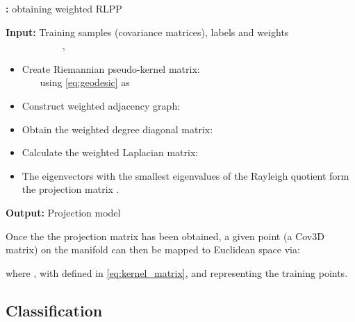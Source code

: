 \documentclass[10pt,twocolumn,letterpaper]{article}
\newcommand{\eqsize}{\footnotesize}
\newcommand{\cov}{{Cov3D}}
\begin{document}
\begin{algorithm}
  \footnotesize
  \raggedright
  \caption{{\bf :} {\footnotesize obtaining weighted RLPP}}
  \label{alg:wrlpp}
  
  \textbf{Input:} Training samples (covariance matrices), labels and weights\\
                  ~~~~~~~~~~~ , \\
  
  \begin{itemize} \leftskip-1em
    \item
      Create Riemannian pseudo-kernel matrix:\\
       ~~~ using \eqref{eq:geodesic} as 
               
    \item
      Construct weighted adjacency graph:\\
      
    \item Obtain the weighted degree  diagonal matrix:\\
               
    \item Calculate the weighted Laplacian matrix:\\
          
    \item The eigenvectors with the  smallest eigenvalues of the Rayleigh quotient  form the projection matrix .
  \end{itemize}
  
  \textbf{Output:} Projection model 
\end{algorithm}

Once the the projection matrix {\eqsize } has been obtained,
a given point {\eqsize } (a {\cov} matrix) on the manifold can then be mapped to Euclidean space via:

\vspace{-1ex}
\eqsize

\normalsize


\noindent
where \mbox{\eqsize },
with {\eqsize } defined in \eqref{eq:kernel_matrix},
and {\eqsize } representing the training points.








\subsection{Classification}
\label{sec:classifier}
\end{document}

